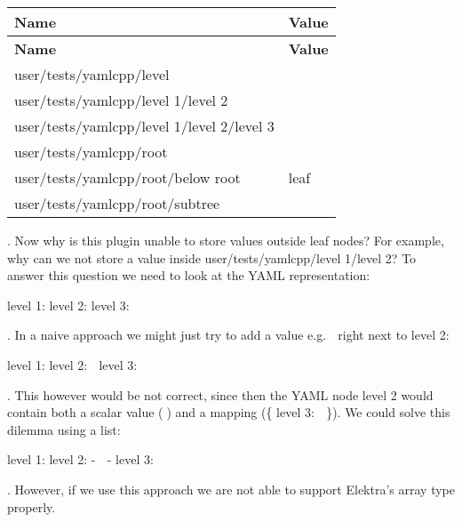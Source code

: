 \tabulinesep=1mm
\begin{longtabu} spread 0pt [c]{*{2}{|X[-1]}|}
\hline
\rowcolor{\tableheadbgcolor}\textbf{ Name }&\textbf{ Value  }\\
\endfirsthead
\hline
\endfoot
\hline
\rowcolor{\tableheadbgcolor}\textbf{ Name }&\textbf{ Value  }\\
\endhead
user/tests/yamlcpp/level &\\
user/tests/yamlcpp/level 1/level 2 &\\
user/tests/yamlcpp/level 1/level 2/level 3 &🍁 \\
user/tests/yamlcpp/root &\\
user/tests/yamlcpp/root/below root &leaf \\
user/tests/yamlcpp/root/subtree &🍂 \\
\end{longtabu}
. Now why is this plugin unable to store values outside leaf nodes? For example, why can we not store a value inside {\ttfamily user/tests/yamlcpp/level 1/level 2}? To answer this question we need to look at the Y\+A\+ML representation\+:


\begin{DoxyCode}
level 1:
  level 2:
    level 3: 🍁
\end{DoxyCode}


. In a naive approach we might just try to add a value e.\+g. {\ttfamily 🙈} right next to level 2\+:


\begin{DoxyCode}
level 1:
  level 2: 🙈
    level 3:  🍁
\end{DoxyCode}


. This however would be not correct, since then the Y\+A\+ML node {\ttfamily level 2} would contain both a scalar value ({\ttfamily 🙈}) and a mapping ({\ttfamily \{ level 3\+: 🍁 \}}). We could solve this dilemma using a list\+:


\begin{DoxyCode}
level 1:
  level 2:
    - 🙈
    - level 3: 🍁
\end{DoxyCode}


. However, if we use this approach we are not able to support Elektra’s array type properly.
